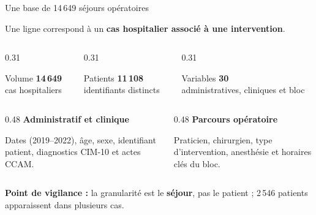 
\begin{frame}{Une base de 14\,649 séjours opératoires}
  \begin{center}
    \small Une ligne correspond à un \textbf{cas hospitalier associé à une intervention}.
  \end{center}

  \begin{columns}[T]
    \begin{column}{0.31\textwidth}
      \begin{exampleblock}{\centering Volume}
        \centering
        {\LARGE\textbf{14\,649}}\\[-1pt]
        {\small cas hospitaliers}
      \end{exampleblock}
    \end{column}
    \begin{column}{0.31\textwidth}
      \begin{block}{\centering Patients}
        \centering
        {\LARGE\textbf{11\,108}}\\[-1pt]
        {\small identifiants distincts}
      \end{block}
    \end{column}
    \begin{column}{0.31\textwidth}
      \begin{alertblock}{\centering Variables}
        \centering
        {\LARGE\textbf{30}}\\[-1pt]
        {\small administratives, cliniques et bloc}
      \end{alertblock}
    \end{column}
  \end{columns}

  \vspace{1em}
  \begin{columns}[T]
    \begin{column}{0.48\textwidth}
      \footnotesize
      \textbf{Administratif et clinique}\par
      Dates (2019--2022), âge, sexe, identifiant patient,
      diagnostics CIM-10 et actes CCAM.
    \end{column}
    \begin{column}{0.48\textwidth}
      \footnotesize
      \textbf{Parcours opératoire}\par
      Praticien, chirurgien, type d'intervention, anesthésie
      et horaires clés du bloc.
    \end{column}
  \end{columns}

  \vspace{0.6em}
  {\footnotesize\textcolor{mcmAlert}{\textbf{Point de vigilance :}}
  la granularité est le \textbf{séjour}, pas le patient ;
  2\,546 patients apparaissent dans plusieurs cas.\par}
\end{frame}

